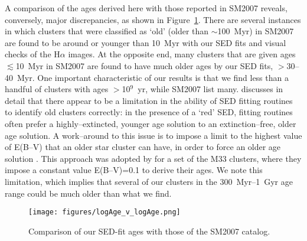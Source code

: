 \documentclass{aastex63}
\begin{document}
A comparison of the ages derived here with those reported in SM2007 reveals, conversely, major discrepancies, as shown in Figure~\ref{logAge_comp}. There are several instances in which clusters that were classified as `old' (older than $\sim$100~Myr) in SM2007 are found to be around or younger than 10~Myr with our SED fits and visual checks of the H$\alpha$ images. At the opposite end, many clusters that are given ages $\lesssim$10~Myr in SM2007 are found to have much older ages by our SED fits, $>$30--40~Myr. One important characteristic of our results is that we find less than a handful of clusters with ages $>$10$^9$~yr, while SM2007 list many. \citet{Whitmore+2020} discusses in detail that there appear to be a limitation in the ability of SED fitting routines to identify old clusters correctly: in the presence of a `red' SED, fitting routines often prefer a highly--extincted, younger age solution to an extinction--free, older age solution. A work--around to this issue is to impose a limit to the highest value of E(B--V) that an older star cluster can have, in order to force an older age solution \citep[as discussed in][]{Whitmore+2020}. This approach was adopted by \citet{Ma+2004b} for a set of the M33 clusters, where they impose a constant value E(B--V)=0.1 to derive their ages. We note this limitation, which implies that several of our clusters in the 300~Myr--1~Gyr age range could be much older than what we find. 

\begin{figure}[ht]
 \centering
 \texttt{[image: figures/logAge\_v\_logAge.png]}
    \caption{Comparison of our SED-fit ages with those of the SM2007 catalog.}
        \label{logAge_comp}
\end{figure}
\end{document}

